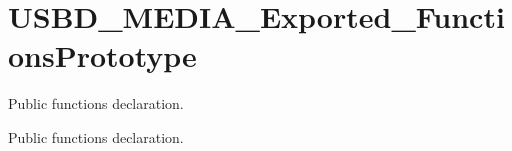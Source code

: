\hypertarget{group__USBD__MEDIA__Exported__FunctionsPrototype}{}\section{U\+S\+B\+D\+\_\+\+M\+E\+D\+I\+A\+\_\+\+Exported\+\_\+\+Functions\+Prototype}
\label{group__USBD__MEDIA__Exported__FunctionsPrototype}


Public functions declaration.  


Public functions declaration. 

